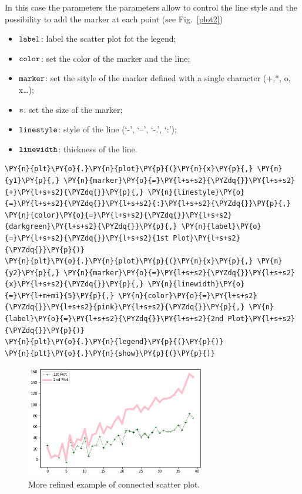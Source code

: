 In this case the parameters the parameters allow to control the line
style and the possibility to add the marker at each point (see Fig.~\ref{plot2})

\begin{itemize}
	\tightlist
	\item
	\(\tt{label}\): label the scatter plot fot the legend;
	\item
	\(\tt{color}\): set the color of the marker and the line;
	\item
	\(\tt{marker}\): set the sityle of the marker defined with a single
	character (+,*, o, x\ldots{});
	\item
	\(\tt{s}\): set the size of the marker;
	\item
	\(\tt{linestyle}\): style of the line (`-', `--', `-.', `:');
	\item
	\(\tt{linewidth}\): thickness of the line.
\end{itemize}

\begin{tcolorbox}[breakable, size=fbox, boxrule=1pt, pad at break*=1mm,colback=cellbackground, colframe=cellborder]
\begin{Verbatim}[commandchars=\\\{\}]
\PY{n}{plt}\PY{o}{.}\PY{n}{plot}\PY{p}{(}\PY{n}{x}\PY{p}{,} \PY{n}{y1}\PY{p}{,} \PY{n}{marker}\PY{o}{=}\PY{l+s+s2}{\PYZdq{}}\PY{l+s+s2}{+}\PY{l+s+s2}{\PYZdq{}}\PY{p}{,} \PY{n}{linestyle}\PY{o}{=}\PY{l+s+s2}{\PYZdq{}}\PY{l+s+s2}{:}\PY{l+s+s2}{\PYZdq{}}\PY{p}{,} \PY{n}{color}\PY{o}{=}\PY{l+s+s2}{\PYZdq{}}\PY{l+s+s2}{darkgreen}\PY{l+s+s2}{\PYZdq{}}\PY{p}{,} \PY{n}{label}\PY{o}{=}\PY{l+s+s2}{\PYZdq{}}\PY{l+s+s2}{1st Plot}\PY{l+s+s2}{\PYZdq{}}\PY{p}{)}
\PY{n}{plt}\PY{o}{.}\PY{n}{plot}\PY{p}{(}\PY{n}{x}\PY{p}{,} \PY{n}{y2}\PY{p}{,} \PY{n}{marker}\PY{o}{=}\PY{l+s+s2}{\PYZdq{}}\PY{l+s+s2}{x}\PY{l+s+s2}{\PYZdq{}}\PY{p}{,} \PY{n}{linewidth}\PY{o}{=}\PY{l+m+mi}{5}\PY{p}{,} \PY{n}{color}\PY{o}{=}\PY{l+s+s2}{\PYZdq{}}\PY{l+s+s2}{pink}\PY{l+s+s2}{\PYZdq{}}\PY{p}{,} \PY{n}{label}\PY{o}{=}\PY{l+s+s2}{\PYZdq{}}\PY{l+s+s2}{2nd Plot}\PY{l+s+s2}{\PYZdq{}}\PY{p}{)}
\PY{n}{plt}\PY{o}{.}\PY{n}{legend}\PY{p}{(}\PY{p}{)}
\PY{n}{plt}\PY{o}{.}\PY{n}{show}\PY{p}{(}\PY{p}{)}
\end{Verbatim}
\end{tcolorbox}

\begin{figure}[htb]
	\centering
	\includegraphics[width=0.7\textwidth]{figures/plot2}
	\caption{More refined example of connected scatter plot.}
	\label{fig:plot2}
\end{figure}

